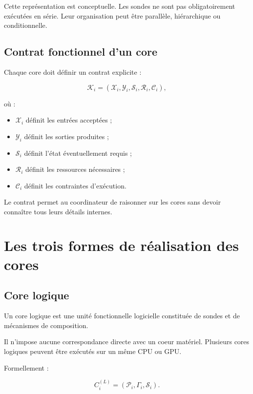 \documentclass[11pt,a4paper]{article}
\begin{document}
Cette représentation est conceptuelle. Les sondes ne sont pas
obligatoirement exécutées en série. Leur organisation peut être
parallèle, hiérarchique ou conditionnelle.

\subsection{Contrat fonctionnel d'un core}

Chaque core doit définir un contrat explicite :

\[
\mathcal{K}_i =
(\mathcal{X}_i,\mathcal{Y}_i,\mathcal{S}_i,
\mathcal{R}_i,\mathcal{C}_i),
\]

où :

\begin{itemize}
  \item $\mathcal{X}_i$ définit les entrées acceptées ;
  \item $\mathcal{Y}_i$ définit les sorties produites ;
  \item $\mathcal{S}_i$ définit l'état éventuellement requis ;
  \item $\mathcal{R}_i$ définit les ressources nécessaires ;
  \item $\mathcal{C}_i$ définit les contraintes d'exécution.
\end{itemize}

Le contrat permet au coordinateur de raisonner sur les cores
sans devoir connaître tous leurs détails internes.

\section{Les trois formes de réalisation des cores}

\subsection{Core logique}

Un core logique est une unité fonctionnelle logicielle constituée
de sondes et de mécanismes de composition.

Il n'impose aucune correspondance directe avec un coeur matériel.
Plusieurs cores logiques peuvent être exécutés sur un même CPU ou GPU.

Formellement :

\[
C_i^{(L)}
=
(\mathcal{P}_i,\Gamma_i,\mathcal{S}_i).
\]
\end{document}
